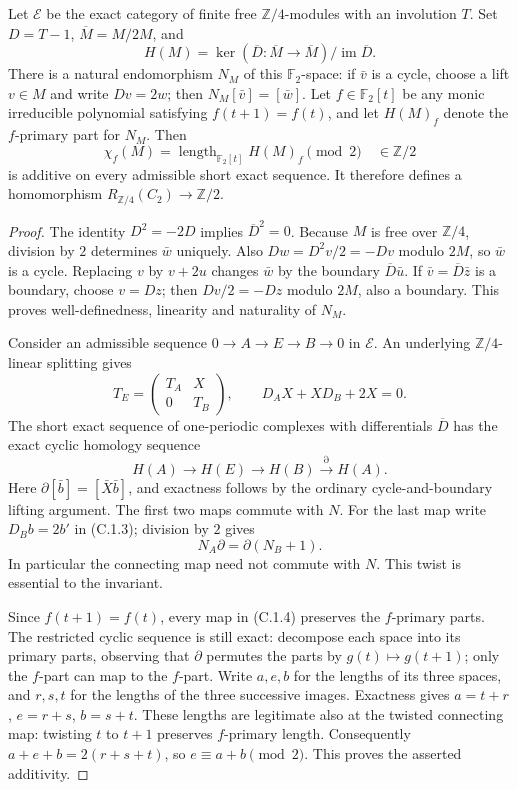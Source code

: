 \begin{lemma}
\label{C:Bockstein_parity}
Let $\mathcal E$ be the exact category of finite free
$\mathbb Z/4$-modules with an involution $T$. Set
$D=T-1$, $\overline M=M/2M$, and
\[
 H(M)=\ker(\overline D:\overline M\to\overline M)\big/
                         \operatorname{im}\overline D.
\]
There is a natural endomorphism $N_M$ of this $\mathbb F_2$-space:
if $\bar v$ is a cycle, choose a lift $v\in M$ and write $Dv=2w$;
then $N_M[\bar v]=[\bar w]$.
Let $f\in\mathbb F_2[t]$ be any monic irreducible polynomial satisfying
$f(t+1)=f(t)$, and let $H(M)_f$ denote the $f$-primary part
for $N_M$. Then
\[
 \chi_f(M)=\operatorname{length}_{\mathbb F_2[t]}H(M)_f\pmod2
       \quad\in\mathbb Z/2                              \tag{C.1.2}
\]
is additive on every admissible short exact sequence. It therefore
defines a homomorphism $R_{\mathbb Z/4}(C_2)\to\mathbb Z/2$.
\end{lemma}
\begin{proof}
The identity $D^2=-2D$ implies $\overline D^2=0$.
Because $M$ is free over $\mathbb Z/4$, division by $2$ determines
$\bar w$ uniquely. Also
$D w=D^2v/2=-Dv$ modulo $2M$, so $\bar w$ is a cycle.
Replacing $v$ by $v+2u$ changes $\bar w$ by the boundary
$\overline D\bar u$. If $\bar v=\overline D\bar z$ is a boundary,
choose $v=Dz$; then $Dv/2=-Dz$ modulo $2M$, also a boundary.
This proves well-definedness, linearity and naturality of $N_M$.

Consider an admissible sequence $0\to A\to E\to B\to0$ in
$\mathcal E$. An underlying $\mathbb Z/4$-linear splitting gives
\[
 T_E=\begin{pmatrix}T_A&X\\0&T_B\end{pmatrix},\qquad
 D_AX+XD_B+2X=0.                                      \tag{C.1.3}
\]
The short exact sequence of one-periodic complexes with differentials
$\overline D$ has the exact cyclic homology sequence
\[
 H(A)\longrightarrow H(E)\longrightarrow H(B)
            \xrightarrow{\partial}H(A).
                                                               \tag{C.1.4}
\]
Here $\partial[\bar b]=[\bar X\bar b]$, and exactness follows by
the ordinary cycle-and-boundary lifting argument. The first two
maps commute with $N$. For the last map write $D_Bb=2b'$ in (C.1.3);
division by $2$ gives
\[
 N_A\partial=\partial(N_B+1).                         \tag{C.1.5}
\]
In particular the connecting map need not commute with $N$.
This twist is essential to the invariant.

Since $f(t+1)=f(t)$, every map in (C.1.4) preserves the $f$-primary
parts. The restricted cyclic sequence is still exact: decompose each
space into its primary parts, observing that $\partial$ permutes
the parts by $g(t)\mapsto g(t+1)$; only the $f$-part can map to
the $f$-part. Write $a,e,b$ for the lengths of its three spaces,
and $r,s,t$ for the lengths of the three successive images.
Exactness gives $a=t+r$, $e=r+s$, $b=s+t$.
These lengths are legitimate also at the twisted connecting map:
twisting $t$ to $t+1$ preserves $f$-primary length. Consequently
$a+e+b=2(r+s+t)$, so $e\equiv a+b\pmod2$.
This proves the asserted additivity.
\end{proof}

